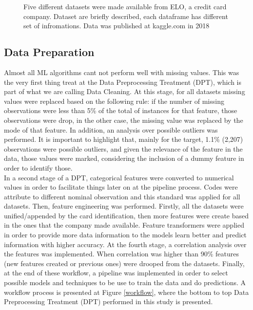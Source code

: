 \documentclass[letterpaper, 10 pt, conference]{ieeeconf}  %
\begin{document}
\begin{figure}[thpb]
\centering
{}
\caption{Five different datasets were made available from ELO, a credit card company. Dataset are briefly described, each dataframe has different set of infromations. Data was published at kaggle.com in 2018 \cite{Kaggle}}
\label{Fig_data}
\end{figure}


\subsection{Data Preparation}
Almost all ML algorithms cant not perform well with missing values. This was the very first thing treat at the Data Preprocessing Treatment (DPT), which is part of what we are calling Data Cleaning. At this stage, for all datasets missing values were replaced based on the following rule: if the number of missing observations were less than 5\% of the total of instances for that feature, those observations were drop, in the other case, the missing value was replaced by the mode of that feature. In addition, an analysis over possible outliers was performed. It is important to highlight that, mainly for the target, 1.1\% (2,207) observations were possible outliers, and given the relevance of the feature in the data, those values were marked, considering the inclusion of a dummy feature in order to identify those.\\

In a second stage of a DPT, categorical features were converted to numerical values in order to facilitate things later on at the pipeline process. Codes were attribute to different nominal observation and this standard was applied for all datasets. Then, feature engineering was performed. Firstly, all the datasets were unified/appended by the card identification, then more features were create based in the ones that the company made available. Feature transformers were applied in order to provide more data information to the models learn better and predict information with higher accuracy. At the fourth stage, a correlation analysis over the features was implemented. When correlation was higher than 90\% features (new features created or previous ones) were drooped from the datasets. Finally, at the end of these workflow, a pipeline was implemented in order to select possible models and techniques to be use to train the data and do predictions. A workflow process is presented at Figure \ref{workflow}, where the bottom to top Data Preprocessing Treatment (DPT) performed in this study is presented. \\
\end{document}
